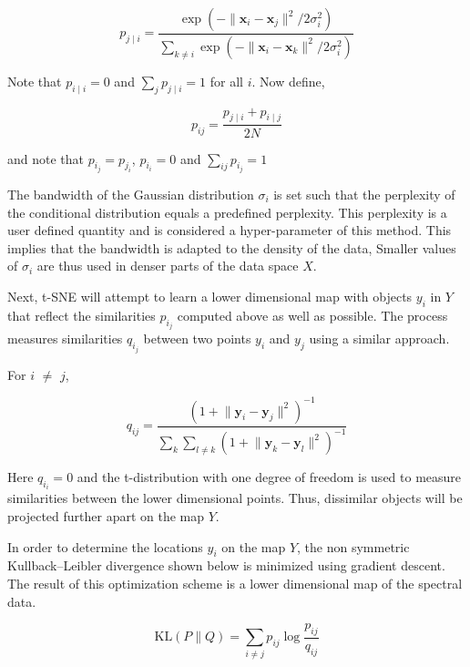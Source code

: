 \begin{equation}
p_{j\mid i}={\frac {\exp(-\lVert \mathbf {x} _{i}-\mathbf {x} _{j}\rVert ^{2}/2\sigma _{i}^{2})}{\sum _{k\neq i}\exp(-\lVert \mathbf {x} _{i}-\mathbf {x} _{k}\rVert ^{2}/2\sigma _{i}^{2})}}
\end{equation}

Note that $p_{i\mid i}=0$ and $\sum _{j}p_{j\mid i}=1$ for all $i$. Now define,

\begin{equation}
    p_{ij}={\frac {p_{j\mid i}+p_{i\mid j}}{2N}}
\end{equation}

and note that $p_i_j=p_j_i$, $p_i_i=0$ and $\sum _{ij} p_i_j=1$

The bandwidth of the Gaussian distribution $\sigma_i$ is set such that the perplexity of the conditional distribution equals a predefined perplexity. This perplexity is a user defined quantity and is considered a hyper-parameter of this method. This implies that the bandwidth is adapted to the density of the data, Smaller values of $\sigma_i$ are thus used in denser parts of the data space $X$. 

Next, t-SNE will attempt to learn a lower dimensional map with objects $y_i$ in $Y$ that reflect the similarities $p_i_j$ computed above as well as possible. The process measures similarities $q_i_j$ between two points $y_i$ and $y_j$ using a similar approach. 

For $i$ $\neq$ $j$,

\begin{equation}
    q_{ij}={\frac {(1+\lVert \mathbf {y} _{i}-\mathbf {y} _{j}\rVert ^{2})^{-1}}{\sum _{k}\sum _{l\neq k}(1+\lVert \mathbf {y} _{k}-\mathbf {y} _{l}\rVert ^{2})^{-1}}}
\end{equation}

Here $q_i_i=0$ and the t-distribution with one degree of freedom is used to measure similarities between the lower dimensional points. Thus, dissimilar objects will be projected further apart on the map $Y$.

In order to determine the locations $y_i$ on the map $Y$, the non symmetric Kullback–Leibler divergence shown below is minimized using gradient descent. The result of this optimization scheme is a lower dimensional map of the spectral data.

\begin{equation}
    \mathrm {KL} \left(P\parallel Q\right)=\sum _{i\neq j}p_{ij}\log {\frac {p_{ij}}{q_{ij}}}
\end{equation}


